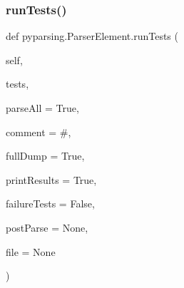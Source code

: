 \subsubsection{\texorpdfstring{run\+Tests()}{runTests()}}
{\footnotesize\ttfamily def pyparsing.\+Parser\+Element.\+run\+Tests (\begin{DoxyParamCaption}\item[{}]{self,  }\item[{}]{tests,  }\item[{}]{parse\+All = {\ttfamily True},  }\item[{}]{comment = {\ttfamily \textquotesingle{}\#\textquotesingle{}},  }\item[{}]{full\+Dump = {\ttfamily True},  }\item[{}]{print\+Results = {\ttfamily True},  }\item[{}]{failure\+Tests = {\ttfamily False},  }\item[{}]{post\+Parse = {\ttfamily None},  }\item[{}]{file = {\ttfamily None} }\end{DoxyParamCaption})}

